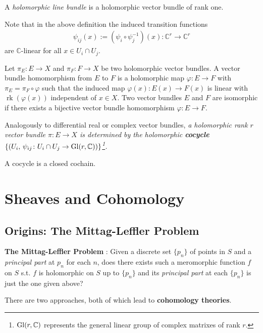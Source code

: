 A \textit{holomorphic line bundle} is a holomorphic vector bundle of rank one.

Note that in the above definition the induced transition functions
\begin{align*}
\psi_{i j}(x):=\left(\psi_i \circ \psi_j^{-1}\right)(x): \mathbb{C}^r \longrightarrow \mathbb{C}^r
\end{align*}
are $\mathbb{C}$-linear for all $x \in U_i \cap U_j$.

Let $\pi_E: E \rightarrow X$ and $\pi_F: F \rightarrow X$ be two holomorphic vector bundles. A vector bundle homomorphism from $E$ to $F$ is a holomorphic map $\varphi: E \rightarrow F$ with $\pi_E=\pi_F \circ \varphi$ such that the induced map $\varphi(x): E(x) \rightarrow F(x)$ is linear with $\operatorname{rk}(\varphi(x))$ independent of $x \in X$. Two vector bundles $E$ and $F$ are isomorphic if there exists a bijective vector bundle homomorphism $\varphi: E \rightarrow F$.

{\normalem
Analogously to differential real or complex vector bundles, \emph{a holomorphic rank $r$ vector bundle $\pi\colon E\to X$ is determined by the holomorphic \textbf{\color{purple} cocycle} $\{(U_i, \, \psi_{ij}\colon U_i\cap U_j \to \operatorname{Gl}(r,{\mathbb C}))\}$\footnote{$\operatorname{Gl}(r,{\mathbb C})$ represents the general linear group of complex matrixes of rank $r$.}.}}

\begin{definition}
  A cocycle is a closed cochain.
\end{definition}

\chapter{Sheaves and Cohomology}
\section{Origins: The Mittag-Leffler Problem}
\begin{fancybox}
  \textbf{The Mittag-Leffler Problem} :  Given a discrete  set $\{p_n\}$ of points in $S$ and a \textit{principal part} at $p_n$ for each $n$, does there exists such a meromorphic function $f$ on $S$ s.t. $f$ is holomorphic on $S$ up to $\{p_n\}$ and its \textit{principal part} at each $\{p_n\}$ is just the one given above?
\end{fancybox}
There are two approaches, both of which lead to \textbf{cohomology theories}. 

